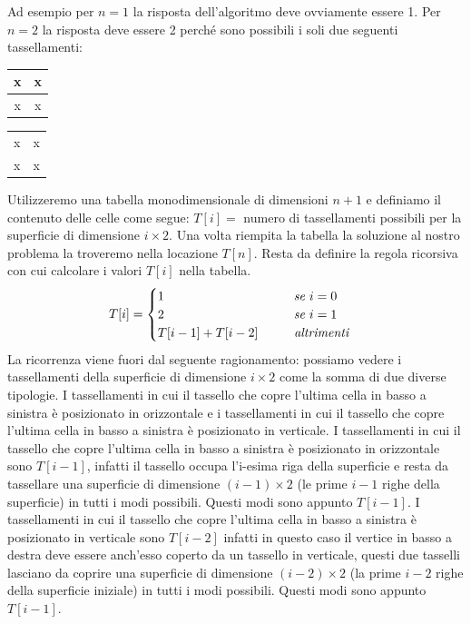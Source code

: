 Ad esempio per $n=1$ la risposta dell'algoritmo deve ovviamente essere 1. Per $n=2$ la risposta deve essere 2 perché sono possibili i soli due seguenti tassellamenti:
\begin{center}
    \begin{tabular}{|c c|}
         \hline x & x\\\hline 
         x & x\\\hline
    \end{tabular}\hspace{1cm}
    \begin{tabular}{|c|c|}
         \hline x & x\\
         x & x\\\hline
    \end{tabular}
\end{center}

Utilizzeremo una tabella monodimensionale di dimensioni $n+1$ e definiamo il contenuto delle celle come segue: $T[i] =$ numero di tassellamenti possibili per la superficie di dimensione $i\times 2$.
Una volta riempita la tabella la soluzione al nostro problema la troveremo nella locazione $T[n]$.
Resta da definire la regola ricorsiva con cui calcolare i valori $T[i]$ nella tabella.
\begin{equation*}T[i]=
    \begin{cases}
        1\hspace{3.6cm}\textit{se } i=0\\
        2\hspace{3.6cm}\textit{se } i=1\\
        T[i-1]+T[i-2]\hspace{1cm}\textit{altrimenti}\\
    \end{cases}
\end{equation*}
La ricorrenza viene fuori dal seguente ragionamento: possiamo vedere i tassellamenti della superficie di dimensione $i\times 2$ come la somma di due diverse tipologie. I tassellamenti in cui il tassello che copre l’ultima cella in basso a sinistra è posizionato in orizzontale e i
tassellamenti in cui il tassello che copre l’ultima cella in basso a sinistra è posizionato in verticale. I tassellamenti in cui il tassello che copre l’ultima cella in basso a sinistra è posizionato in orizzontale sono $T[i - 1]$, infatti il tassello occupa l’i-esima riga della superficie e resta da tassellare una superficie di dimensione $(i - 1)\times 2$ (le prime $i - 1$ righe della superficie) in tutti i modi possibili. Questi modi sono appunto $T[i - 1]$. I tassellamenti in cui il tassello che copre l’ultima cella in basso a sinistra è posizionato in verticale sono $T[i - 2]$ infatti in questo caso il vertice in basso a destra deve essere anch’esso coperto da un tassello in verticale, questi due tasselli lasciano da coprire una superficie di dimensione $(i - 2)\times 2$ (la prime $i - 2$ righe della superficie iniziale) in tutti i modi possibili. Questi modi sono appunto $T[i - 1]$.

